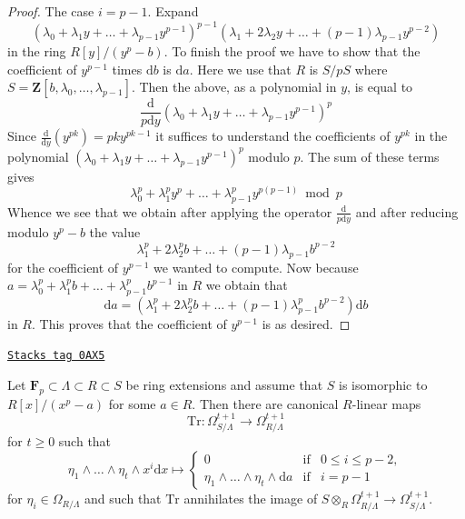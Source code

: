 \begin{proof}
\medskip\noindent
The case $i = p - 1$. Expand
$$
(\lambda_0 + \lambda_1 y + \ldots + \lambda_{p - 1}y^{p - 1})^{p - 1}
(\lambda_1 + 2 \lambda_2 y + \ldots + (p - 1)\lambda_{p - 1}y^{p - 2})
$$
in the ring $R[y]/(y^p - b)$. To finish the proof we have to show that
the coefficient of $y^{p - 1}$ times $\text{d}b$ is $\text{d}a$.
Here we use that $R$ is $S/pS$ where
$S = \mathbf{Z}[b, \lambda_0, \ldots, \lambda_{p - 1}]$.
Then the above, as a polynomial in $y$, is equal to
$$
\frac{\text{d}}{p\text{d}y}
(\lambda_0 + \lambda_1 y + \ldots + \lambda_{p - 1}y^{p - 1})^p
$$
Since $\frac{\text{d}}{\text{d}y}(y^{pk}) = pk y^{pk - 1}$
it suffices to understand the coefficients of $y^{pk}$ in the polynomial
$(\lambda_0 + \lambda_1 y + \ldots + \lambda_{p - 1}y^{p - 1})^p$
modulo $p$. The sum of these terms gives
$$
\lambda_0^p + \lambda_1^py^p + \ldots + \lambda_{p - 1}^py^{p(p - 1)}
\bmod p
$$
Whence we see that we obtain after applying the operator
$\frac{\text{d}}{p\text{d}y}$ and after reducing modulo $y^p - b$
the value
$$
\lambda_1^p + 2\lambda_2^pb + \ldots + (p - 1)\lambda_{p - 1}b^{p - 2}
$$
for the coefficient of $y^{p - 1}$ we wanted to compute. Now because
$a = \lambda_0^p + \lambda_1^p b + \ldots + \lambda_{p - 1}^pb^{p - 1}$
in $R$ we obtain that
$$
\text{d}a = (\lambda_1^p  + 2 \lambda_2^p b + \ldots +
(p - 1) \lambda_{p - 1}^p b^{p - 2}) \text{d}b
$$
in $R$. This proves that the coefficient of $y^{p - 1}$ is as desired.
\end{proof}

\begin{lemma}
\label{resolve-lemma-trace-higher}
\href{https://stacks.math.columbia.edu/tag/0AX5}{\texttt{Stacks tag 0AX5}}

Let $\mathbf{F}_p \subset \Lambda \subset R \subset S$ be ring extensions
and assume that $S$ is isomorphic to $R[x]/(x^p - a)$ for some $a \in R$.
Then there are canonical $R$-linear maps
$$
\text{Tr} :
\Omega^{t + 1}_{S/\Lambda}
\longrightarrow
\Omega_{R/\Lambda}^{t + 1}
$$
for $t \geq 0$ such that
$$
\eta_1 \wedge \ldots \wedge \eta_t \wedge x^i\text{d}x
\longmapsto
\left\{
\begin{matrix}
0 & \text{if} & 0 \leq i \leq p - 2, \\
\eta_1 \wedge \ldots \wedge \eta_t \wedge \text{d}a & \text{if} & i = p - 1
\end{matrix}
\right.
$$
for $\eta_i \in \Omega_{R/\Lambda}$ and such that $\text{Tr}$ annihilates the
image of
$S \otimes_R \Omega_{R/\Lambda}^{t + 1} \to \Omega_{S/\Lambda}^{t + 1}$.
\end{lemma}

